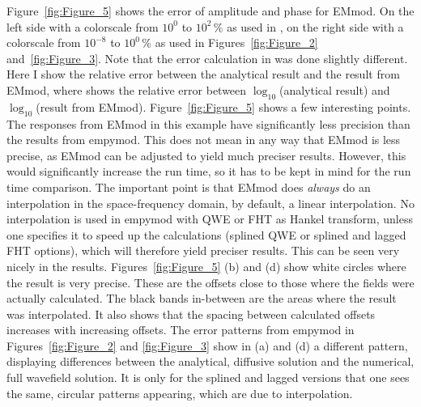 \documentclass[manuscript,revised]{geophysics}
\begin{document}
Figure~\ref{fig:Figure_5} shows the error of amplitude and phase for EMmod. On
the left side with a colorscale from $10^0$ to $10^2$\,\% as used in
\cite{GEO.15.Hunziker}, on the right side with a colorscale from $10^{-8}$ to
$10^0$\,\% as used in Figures~\ref{fig:Figure_2}
and~\ref{fig:Figure_3}. Note that the error calculation in
\cite{GEO.15.Hunziker} was done slightly different. Here I show the relative
error between the analytical result and the result from EMmod, where
\cite{GEO.15.Hunziker} shows the relative error between $\log_{10}$(analytical
result) and $\log_{10}$(result from EMmod).
%
%
Figure~\ref{fig:Figure_5} shows a few interesting points. The responses from
EMmod in this example have significantly less precision than the results from
empymod. This does not mean in any way that EMmod is less precise, as EMmod can
be adjusted to yield much preciser results. However, this would significantly
increase the run time, so it has to be kept in mind for the run time
comparison. The important point is that EMmod does \emph{always} do an
interpolation in the space-frequency domain, by default, a linear
interpolation. No interpolation is used in empymod with QWE or FHT as Hankel
transform, unless one specifies it to speed up the calculations (splined QWE or
splined and lagged FHT options), which will therefore yield preciser results.
This can be seen very nicely in the results. Figures~\ref{fig:Figure_5} (b) and
(d) show white circles where the result is very precise. These are the offsets
close to those where the fields were actually calculated. The black bands
in-between are the areas where the result was interpolated. It also shows that
the spacing between calculated offsets increases with increasing offsets.  The
error patterns from empymod in Figures~\ref{fig:Figure_2} and
\ref{fig:Figure_3} show in (a) and (d) a different pattern, displaying
differences between the analytical, diffusive solution and the numerical, full
wavefield solution. It is only for the splined and lagged versions that one
sees the same, circular patterns appearing, which are due to interpolation.
\end{document}
